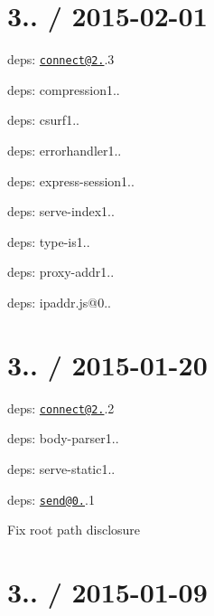 \section*{3.. / 2015-\/02-\/01 }


\begin{DoxyItemize}
\item deps\+: \href{mailto:connect@2.28}{\tt connect@2.}.3
\begin{DoxyItemize}
\item deps\+: compression1..
\item deps\+: csurf1..
\item deps\+: errorhandler1..
\item deps\+: express-\/session1..
\item deps\+: serve-\/index1..
\item deps\+: type-\/is1..
\end{DoxyItemize}
\item deps\+: proxy-\/addr1..
\begin{DoxyItemize}
\item deps\+: ipaddr.\+js@0..
\end{DoxyItemize}
\end{DoxyItemize}

\section*{3.. / 2015-\/01-\/20 }


\begin{DoxyItemize}
\item deps\+: \href{mailto:connect@2.28}{\tt connect@2.}.2
\begin{DoxyItemize}
\item deps\+: body-\/parser1..
\item deps\+: serve-\/static1..
\end{DoxyItemize}
\item deps\+: \href{mailto:send@0.11}{\tt send@0.}.1
\begin{DoxyItemize}
\item Fix root path disclosure
\end{DoxyItemize}
\end{DoxyItemize}

\section*{3.. / 2015-\/01-\/09 }


